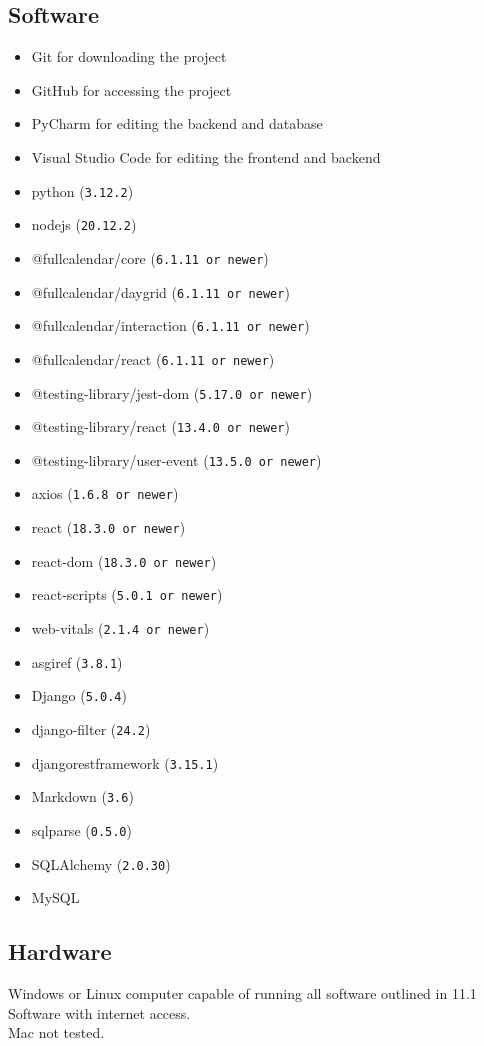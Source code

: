 \documentclass[]{article}
\begin{document}
	\subsection{Software}
		\begin{itemize}
			\item Git for downloading the project
			\item GitHub for accessing the project
			\item PyCharm for editing the backend and database
			\item Visual Studio Code for editing the frontend and backend
			\item python (\texttt{3.12.2})
			\item nodejs (\texttt{20.12.2})
			\item @fullcalendar/core (\texttt{6.1.11 or newer}) 
			\item @fullcalendar/daygrid (\texttt{6.1.11 or newer}) 
			\item @fullcalendar/interaction (\texttt{6.1.11 or newer}) 
			\item @fullcalendar/react (\texttt{6.1.11 or newer}) 
			\item @testing-library/jest-dom (\texttt{5.17.0 or newer}) 
			\item @testing-library/react (\texttt{13.4.0 or newer}) 
			\item @testing-library/user-event (\texttt{13.5.0 or newer}) 
			\item axios (\texttt{1.6.8 or newer}) 
			\item react (\texttt{18.3.0 or newer}) 
			\item react-dom (\texttt{18.3.0 or newer}) 
			\item react-scripts (\texttt{5.0.1 or newer}) 
			\item web-vitals (\texttt{2.1.4 or newer})
			\item asgiref (\texttt{3.8.1})
			\item Django (\texttt{5.0.4})
			\item django-filter (\texttt{24.2})
			\item djangorestframework (\texttt{3.15.1})
			\item Markdown (\texttt{3.6})
			\item sqlparse (\texttt{0.5.0})
			\item SQLAlchemy (\texttt{2.0.30})
			\item MySQL
		\end{itemize}
	\subsection{Hardware}
		Windows or Linux computer capable of running all software outlined in 11.1 Software with internet access.\\
		Mac not tested.
\end{document}

